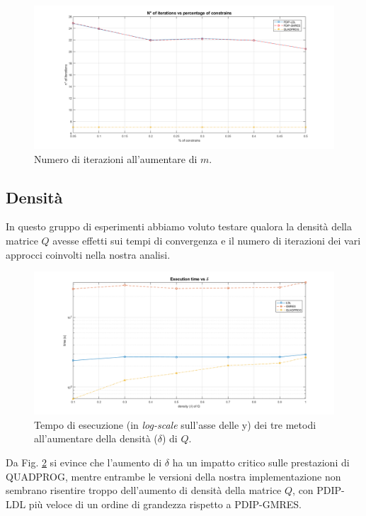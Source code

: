 \begin{figure}[!h]
    \centering
    \includegraphics[width=\textwidth]{img/MU8.png}
    \caption{Numero di iterazioni all'aumentare di $m$. \label{fig:exp2.2}}
\end{figure}


\subsection{Densità}

 In questo gruppo di esperimenti abbiamo voluto testare qualora la densità della matrice $Q$ avesse effetti sui tempi di convergenza e il numero di iterazioni dei vari approcci coinvolti nella nostra analisi.

\begin{figure}[h]
    \centering
    \includegraphics[width=\textwidth]{img/MU4.png}
    \caption{Tempo di esecuzione (in \textit{log-scale} sull'asse delle y) dei tre metodi all'aumentare della densità ($\delta$) di $Q$. \label{fig:exp3.1}}
\end{figure}
 
Da Fig. \ref{fig:exp3.1} si evince che l'aumento di $\delta$ ha un impatto critico sulle prestazioni di QUADPROG, mentre entrambe le versioni della nostra implementazione non sembrano risentire troppo dell'aumento di densità della matrice $Q$, con PDIP-LDL più veloce di un ordine di grandezza rispetto a PDIP-GMRES. 


